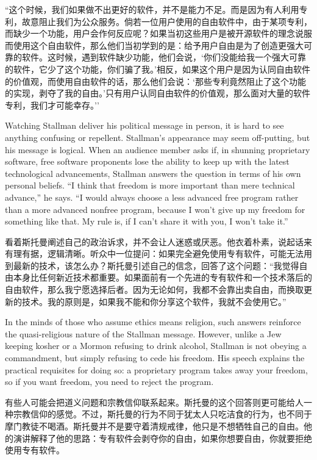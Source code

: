 \ifdefined\chs
``这个时候，我们如果做不出更好的软件，并不是能力不足。而是因为有人利用专利，故意阻止我们为公众服务。倘若一位用户使用的自由软件中，由于某项专利，而缺少一个功能，用户会作何反应呢？如果当初这些用户是被开源软件的理念说服而使用这个自由软件，那么他们当初学到的是：给予用户自由是为了创造更强大可靠的软件。这时候，遇到软件缺少功能，他们会说，`你们没能给我一个强大可靠的软件，它少了这个功能，你们骗了我。'相反，如果这个用户是因为认同自由软件的价值观，而使用自由软件的话，那么他们会说：`那些专利竟然阻止了这个功能的实现，剥夺了我的自由。'只有用户认同自由软件的价值观，那么面对大量的软件专利，我们才可能幸存。''
\fi
\fi

\ifdefined\eng
Watching Stallman deliver his political message in person, it is hard to see anything confusing or repellent. Stallman's appearance may seem off-putting, but his message is logical. When an audience member asks if, in shunning proprietary software, free software proponents lose the ability to keep up with the latest technological advancements, Stallman answers the question in terms of his own personal beliefs. ``I think that freedom is more important than mere technical advance,'' he says. ``I would always choose a less advanced free program rather than a more advanced nonfree program, because I won't give up my freedom for something like that. My rule is, if I can't share it with you, I won't take it.''
\fi

\ifdefined\chs
看着斯托曼阐述自己的政治诉求，并不会让人迷惑或厌恶。他衣着朴素，说起话来有理有据，逻辑清晰。听众中一位提问：如果完全避免使用专有软件，可能无法用到最新的技术，该怎么办？斯托曼引述自己的信念，回答了这个问题：``我觉得自由本身比任何新近技术都重要。如果面前有一个先进的专有软件和一个技术落后的自由软件，那么我宁愿选择后者。因为无论如何，我都不会靠出卖自由，而换取更新的技术。我的原则是，如果我不能和你分享这个软件，我就不会使用它。''
\fi

\ifdefined\vtwo
\ifdefined\eng
In the minds of those who assume ethics means religion, such answers reinforce the quasi-religious nature of the Stallman message. However, unlike a Jew keeping kosher or a Mormon refusing to drink alcohol, Stallman is not obeying a commandment, but simply refusing to cede his freedom.  His speech explains the practical requisites for doing so: a proprietary program takes away your freedom, so if you want freedom, you need to reject the program.
\fi

\ifdefined\chs
有些人可能会把道义问题和宗教信仰联系起来。斯托曼的这个回答则更可能给人一种宗教信仰的感觉。不过，斯托曼的行为不同于犹太人只吃洁食的行为，也不同于摩门教徒不喝酒。斯托曼并不是要守着清规戒律，他只是不想牺牲自己的自由。他的演讲解释了他的思路：专有软件会剥夺你的自由，如果你想要自由，你就要拒绝使用专有软件。
\fi

